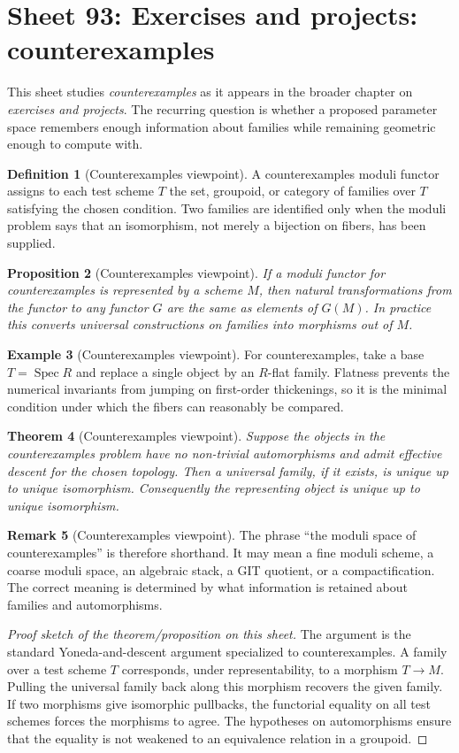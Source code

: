 \documentclass[11pt]{amsart}
\newtheorem{theorem}{Theorem}[section]
\newtheorem{proposition}[theorem]{Proposition}
\theoremstyle{definition}
\newtheorem{definition}[theorem]{Definition}
\newtheorem{example}[theorem]{Example}
\newtheorem{remark}[theorem]{Remark}
\newcommand{\Spec}{\operatorname{Spec}}
\begin{document}
\section{Sheet 93: Exercises and projects: counterexamples}
This sheet studies \emph{counterexamples} as it appears in the broader chapter on \emph{exercises and projects}.  The recurring question is whether a proposed parameter space remembers enough information about families while remaining geometric enough to compute with.
\begin{definition}[Counterexamples viewpoint]
A counterexamples moduli functor assigns to each test scheme $T$ the set, groupoid, or category of families over $T$ satisfying the chosen condition.  Two families are identified only when the moduli problem says that an isomorphism, not merely a bijection on fibers, has been supplied.
\end{definition}
\begin{proposition}[Counterexamples viewpoint]
If a moduli functor for counterexamples is represented by a scheme $M$, then natural transformations from the functor to any functor $G$ are the same as elements of $G(M)$.  In practice this converts universal constructions on families into morphisms out of $M$.
\end{proposition}
\begin{example}[Counterexamples viewpoint]
For counterexamples, take a base $T=\Spec R$ and replace a single object by an $R$-flat family.  Flatness prevents the numerical invariants from jumping on first-order thickenings, so it is the minimal condition under which the fibers can reasonably be compared.
\end{example}
\begin{theorem}[Counterexamples viewpoint]
Suppose the objects in the counterexamples problem have no non-trivial automorphisms and admit effective descent for the chosen topology.  Then a universal family, if it exists, is unique up to unique isomorphism.  Consequently the representing object is unique up to unique isomorphism.
\end{theorem}
\begin{remark}[Counterexamples viewpoint]
The phrase ``the moduli space of counterexamples'' is therefore shorthand.  It may mean a fine moduli scheme, a coarse moduli space, an algebraic stack, a GIT quotient, or a compactification.  The correct meaning is determined by what information is retained about families and automorphisms.
\end{remark}
\begin{proof}[Proof sketch of the theorem/proposition on this sheet]
The argument is the standard Yoneda-and-descent argument specialized to counterexamples.  A family over a test scheme $T$ corresponds, under representability, to a morphism $T\to M$.  Pulling the universal family back along this morphism recovers the given family.  If two morphisms give isomorphic pullbacks, the functorial equality on all test schemes forces the morphisms to agree.  The hypotheses on automorphisms ensure that the equality is not weakened to an equivalence relation in a groupoid.
\end{proof}
\end{document}
